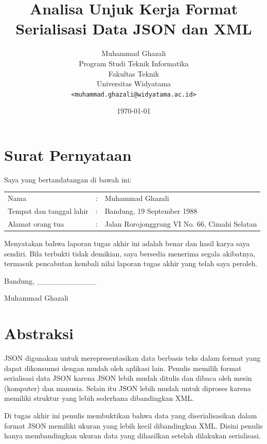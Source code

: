\documentclass[a4paper, 12pt, oneside]{report}
\title{\textbf{Analisa Unjuk Kerja Format Serialisasi Data JSON dan XML}}
\author{
Muhammad Ghazali\\
Program Studi Teknik Informatika\\
Fakultas Teknik\\
Universitas Widyatama
\\\texttt{<muhammad.ghazali@widyatama.ac.id>}
}
\date{\today}
\begin{document}
\maketitle

\chapter*{Surat Pernyataan}

\onehalfspacing Saya yang bertandatangan di bawah ini:

\begin{tabular}{lll}
Nama & : & Muhammad Ghazali\\
Tempat dan tanggal lahir & : & Bandung, 19 September 1988\\
Alamat orang tua & : & Jalan Rorojonggrang VI No. 66, Cimahi Selatan\\
\end{tabular}

\onehalfspacing Menyatakan bahwa laporan tugas akhir ini adalah benar dan hasil karya saya sendiri. Bila terbukti tidak demikian, saya bersedia menerima segala akibatnya, termasuk pencabutan kembali nilai laporan tugas akhir yang telah saya peroleh.

\begin{flushright}
Bandung, \_\_\_\_\_\_\_\_\_\_\_

Muhammad Ghazali

\end{flushright}

\chapter*{Abstraksi}

\onehalfspacing JSON digunakan untuk merepresentasikan data berbasis teks dalam format yang dapat dikonsumsi dengan mudah oleh aplikasi lain. Penulis memilih format serialisasi data JSON karena JSON lebih mudah ditulis dan dibaca oleh mesin (komputer) dan manusia. Selain itu JSON lebih mudah untuk diproses karena memiliki struktur yang lebih sederhana dibandingkan XML\cite{json-fat-free}\cite{json-vs-xml-debate}. 

\onehalfspacing Di tugas akhir ini penulis membuktikan bahwa data yang diserialisasikan dalam format JSON memiliki ukuran yang lebih kecil dibandingkan XML. Disini penulis hanya membandingkan ukuran data yang dihasilkan setelah dilakukan serialisasi.
\end{document}
